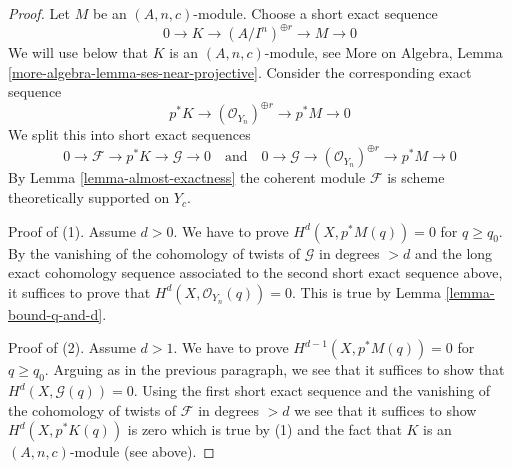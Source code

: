 \documentclass{stacks-project}
\theoremstyle{plain}
\theoremstyle{definition}
\theoremstyle{remark}
\numberwithin{equation}{subsection}
\begin{document}
\begin{proof}
Let $M$ be an $(A, n, c)$-module. Choose a short exact sequence
$$
0 \to K \to (A/I^n)^{\oplus r} \to M \to 0
$$
We will use below that $K$ is an $(A, n, c)$-module, see More on Algebra,
Lemma \ref{more-algebra-lemma-ses-near-projective}.
Consider the corresponding exact sequence
$$
p^*K \to (\mathcal{O}_{Y_n})^{\oplus r} \to p^*M \to 0
$$
We split this into short exact sequences
$$
0 \to \mathcal{F} \to p^*K \to \mathcal{G} \to 0
\quad\text{and}\quad
0 \to \mathcal{G} \to (\mathcal{O}_{Y_n})^{\oplus r} \to p^*M \to 0
$$
By Lemma \ref{lemma-almost-exactness} the coherent module $\mathcal{F}$
is scheme theoretically supported on $Y_c$.

\medskip\noindent
Proof of (1). Assume $d > 0$. We have to prove
$H^d(X, p^*M(q)) = 0$ for $q \geq q_0$.
By the vanishing of the cohomology of twists of $\mathcal{G}$ in degrees $> d$
and the long exact cohomology sequence associated to the second
short exact sequence above, it suffices to prove that
$H^d(X, \mathcal{O}_{Y_n}(q)) = 0$.
This is true by Lemma \ref{lemma-bound-q-and-d}.

\medskip\noindent
Proof of (2). Assume $d > 1$. We have to prove
$H^{d - 1}(X, p^*M(q)) = 0$ for $q \geq q_0$.
Arguing as in the previous paragraph, we see that it suffices
to show that $H^d(X, \mathcal{G}(q)) = 0$. Using the first
short exact sequence and the vanishing of the cohomology
of twists of $\mathcal{F}$ in degrees $> d$ we see that it suffices
to show $H^d(X, p^*K(q))$ is zero which is
true by (1) and the fact that $K$ is an $(A, n, c)$-module (see above).


\end{proof}
\end{document}
